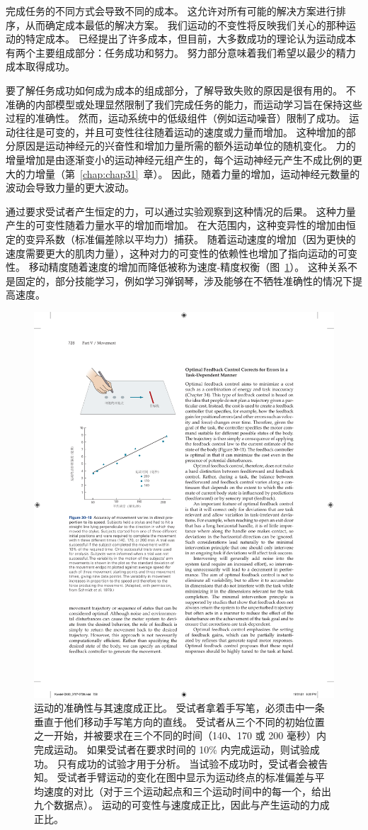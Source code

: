 完成任务的不同方式会导致不同的成本。
这允许对所有可能的解决方案进行排序，从而确定成本最低的解决方案。
我们运动的不变性将反映我们关心的那种运动的特定成本。
已经提出了许多成本，但目前，大多数成功的理论认为运动成本有两个主要组成部分：任务成功和努力。
努力部分意味着我们希望以最少的精力成本取得成功。


要了解任务成功如何成为成本的组成部分，了解导致失败的原因是很有用的。
不准确的内部模型或处理显然限制了我们完成任务的能力，而运动学习旨在保持这些过程的准确性。
然而，运动系统中的低级组件（例如运动噪音）限制了成功。
运动往往是可变的，并且可变性往往随着运动的速度或力量而增加。
这种增加的部分原因是运动神经元的兴奋性和增加力量所需的额外运动单位的随机变化。
力的增量增加是由逐渐变小的运动神经元组产生的，每个运动神经元产生不成比例的更大的力增量（第~\ref{chap:chap31}~章）。
因此，随着力量的增加，运动神经元数量的波动会导致力量的更大波动。


通过要求受试者产生恒定的力，可以通过实验观察到这种情况的后果。
这种力量产生的可变性随着力量水平的增加而增加。
在大范围内，这种变异性的增加由恒定的变异系数（标准偏差除以平均力）捕获。
随着运动速度的增加（因为更快的速度需要更大的肌肉力量），这种对力的可变性的依赖性也增加了指向运动的可变性。
移动精度随着速度的增加而降低被称为速度-精度权衡（图~\ref{fig:30_10}）。
这种关系不是固定的，部分技能学习，例如学习弹钢琴，涉及能够在不牺牲准确性的情况下提高速度。


\begin{figure}[htbp]
	\centering
	\includegraphics[width=0.6\linewidth]{chap30/fig_30_10}
	\caption{运动的准确性与其速度成正比。
		受试者拿着手写笔，必须击中一条垂直于他们移动手写笔方向的直线。
		受试者从三个不同的初始位置之一开始，并被要求在三个不同的时间（140、170 或 200 毫秒）内完成运动。
		如果受试者在要求时间的 10\% 内完成运动，则试验成功。
		只有成功的试验才用于分析。
		当试验不成功时，受试者会被告知。
		受试者手臂运动的变化在图中显示为运动终点的标准偏差与平均速度的对比（对于三个运动起点和三个运动时间中的每一个，给出九个数据点）。
		运动的可变性与速度成正比，因此与产生运动的力成正比\cite{schmidt1979motor}。}
	\label{fig:30_10}
\end{figure}



